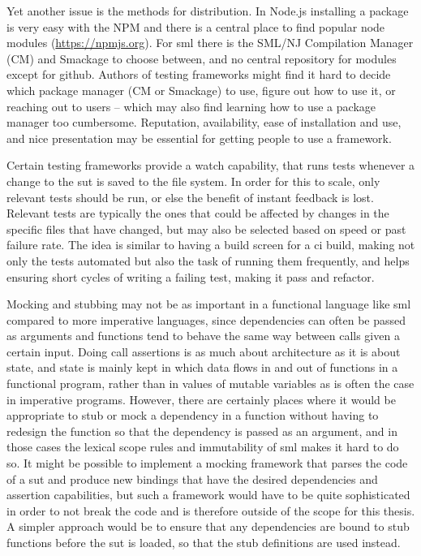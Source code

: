 \documentclass[11pt]{article}
\begin{document}
Yet another issue is the methods for distribution. In Node.js installing a package is very easy with the NPM and there is a central place to find popular node modules (\url{https://npmjs.org}). For \gls{sml} there is the SML/NJ Compilation Manager (CM) and Smackage to choose between, and no central repository for modules except for github. Authors of testing frameworks might find it hard to decide which package manager (CM or Smackage) to use, figure out how to use it, or reaching out to users -- which may also find learning how to use a package manager too cumbersome. Reputation, availability, ease of installation and use, and nice presentation may be essential for getting people to use a framework. %

Certain testing frameworks provide a watch capability, that runs tests whenever a change to the \gls{sut} is saved to the file system. In order for this to scale, only relevant tests should be run, or else the benefit of instant feedback is lost. Relevant tests are typically the ones that could be affected by changes in the specific files that have changed, but may also be selected based on speed or past failure rate. The idea is similar to having a build screen for a \gls{ci} build, making not only the tests automated but also the task of running them frequently, and helps ensuring short cycles of writing a failing test, making it pass and refactor.

Mocking and stubbing may not be as important in a functional language like \gls{sml} compared to more imperative languages, since dependencies can often be passed as arguments and functions tend to behave the same way between calls given a certain input. Doing call assertions is as much about architecture as it is about state, and state is mainly kept in which data flows in and out of functions in a functional program, rather than in values of mutable variables as is often the case in imperative programs. However, there are certainly places where it would be appropriate to stub or mock a dependency in a function without having to redesign the function so that the dependency is passed as an argument, and in those cases the lexical scope rules and immutability of \gls{sml} makes it hard to do so. It might be possible to implement a mocking framework that parses the code of a \gls{sut} and produce new bindings that have the desired dependencies and assertion capabilities, but such a framework would have to be quite sophisticated in order to not break the code and is therefore outside of the scope for this thesis. A simpler approach would be to ensure that any dependencies are bound to stub functions before the \gls{sut} is loaded, so that the stub definitions are used instead. %
\end{document}
